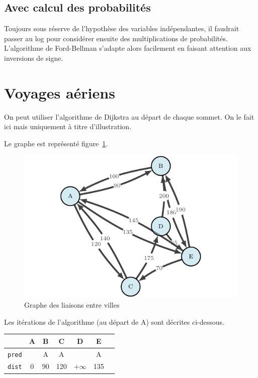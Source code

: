 \documentclass[paper=a4, fontsize=11pt]{scrartcl} %
\numberwithin{equation}{section} %
\numberwithin{figure}{section} %
\numberwithin{table}{section} %
\begin{document}
\subsection{Avec calcul des probabilités}

Toujours sous réserve de l'hypothèse des variables indépendantes, il faudrait passer au log pour considérer ensuite des multiplications de probabilités. L'algorithme de Ford-Bellman s'adapte alors facilement en faisant attention aux inversions de signe.


\section{Voyages aériens}

On peut utiliser l'algorithme de Dijkstra au départ de chaque sommet. On le fait ici mais uniquement à titre d'illustration.

Le graphe est représenté figure~\ref{fig:airline}.

\begin{figure}
  \begin{center}
    \includegraphics[width=12cm]{airline.pdf}
    \caption{Graphe des liaisons entre villes}
    \label{fig:airline}
  \end{center}
\end{figure}

Les itérations de l'algorithme (au départ de A) sont décrites ci-dessous. 

  
\begin{tabular}{c|cccccc}
  & \textbf{A}	&B	&C	&D	&E	& \\
  \hline
  \texttt{pred} &	&A	&A	&	&A	&\\
  \texttt{dist} & 0	&90	&120	&$+\infty$	&135	&\\
\end{tabular}
\end{document}
